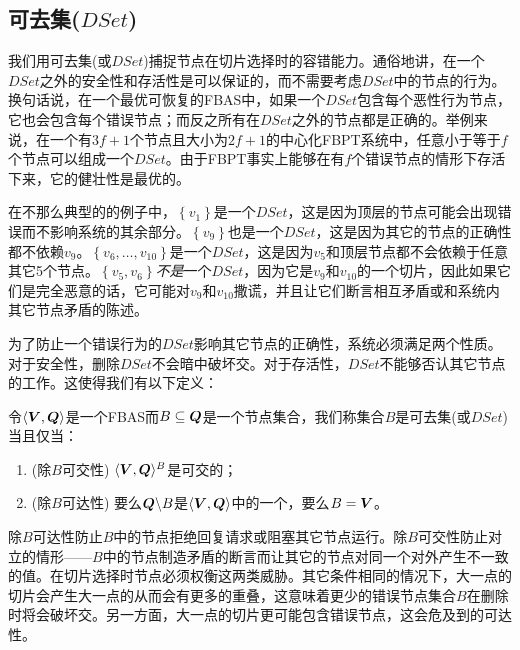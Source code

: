 \subsection{可去集($DSet$)}
我们用可去集(或$DSet$)捕捉节点在切片选择时的容错能力。通俗地讲，在一个$DSet$之外的安全性和存活性是可以保证的，而不需要考虑$DSet$中的节点的行为。换句话说，在一个最优可恢复的FBAS中，如果一个$DSet$包含每个恶性行为节点，它也会包含每个错误节点；而反之所有在$DSet$之外的节点都是正确的。举例来说，在一个有$3f+1$个节点且{\quorum}大小为$2f+1$的中心化FBPT系统中，任意小于等于$f$个节点可以组成一个$DSet$。由于FBPT事实上能够在有$f$个错误节点的情形下存活下来，它的健壮性是最优的。

在不那么典型的的例子中，$\left\{v_1\right\}$是一个$DSet$，这是因为顶层的节点可能会出现错误而不影响系统的其余部分。$\left\{v_9\right\}$也是一个$DSet$，这是因为其它的节点的正确性都不依赖$v_9$。$\left\{v_6,\ldots,v_{10}\right\}$是一个$DSet$，这是因为$v_5$和顶层节点都不会依赖于任意其它5个节点。$\left\{v_5,v_6\right\}$\textit{不是}一个$DSet$，因为它是$v_9$和$v_{10}$的一个切片，因此如果它们是完全恶意的话，它可能对$v_9$和$v_{10}$撒谎，并且让它们断言相互矛盾或和系统内其它节点矛盾的陈述。

为了防止一个错误行为的$DSet$影响其它节点的正确性，系统必须满足两个性质。对于安全性，删除$DSet$不会暗中破坏{\quorum}交。对于存活性，$DSet$不能够否认其它节点的工作{\quorum}。这使得我们有以下定义：

\begin{definition}[DSet]
        令$\langle{\bm V},{\bm Q}\rangle$是一个FBAS而$B\subseteq {\bm Q}$是一个节点集合，我们称集合$B$是可去集(或$DSet$)当且仅当：
        \begin{enumerate}
                \item (除$B${\quorum}可交性) $\langle{\bm V},{\bm Q}\rangle^{B}$是{\quorum}可交的；
                \item (除$B${\quorum}可达性) 要么${\bm Q}\backslash B$是$\langle{\bm V},{\bm Q}\rangle$中的一个{\quorum}，要么$B={\bm V}$。
        \end{enumerate}
\end{definition}

除$B${\quorum}可达性防止$B$中的节点拒绝回复请求或阻塞其它节点运行。除$B${\quorum}可交性防止对立的情形——$B$中的节点制造矛盾的断言而让其它的节点对同一个{\slot}对外产生不一致的值。在切片选择时节点必须权衡这两类威胁。其它条件相同的情况下，大一点的切片会产生大一点的{\quorum}从而会有更多的重叠，这意味着更少的错误节点集合$B$在删除时将会破坏{\quorum}交。另一方面，大一点的切片更可能包含错误节点，这会危及到{\quorum}的可达性。

